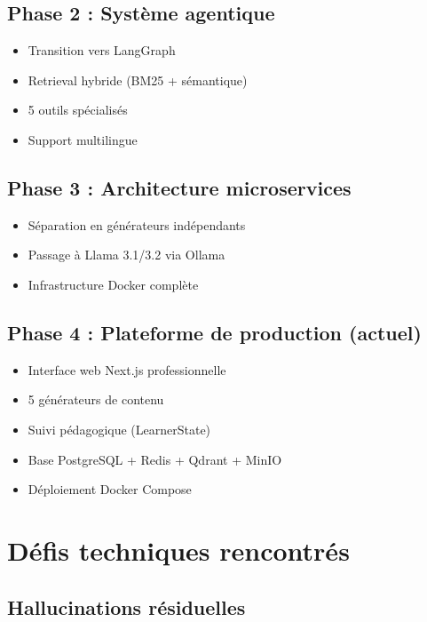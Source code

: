 \documentclass[12pt,a4paper]{article}
\begin{document}
\subsection{Phase 2 : Système agentique}

\begin{itemize}
    \item Transition vers LangGraph
    \item Retrieval hybride (BM25 + sémantique)
    \item 5 outils spécialisés
    \item Support multilingue
\end{itemize}

\subsection{Phase 3 : Architecture microservices}

\begin{itemize}
    \item Séparation en générateurs indépendants
    \item Passage à Llama 3.1/3.2 via Ollama
    \item Infrastructure Docker complète
\end{itemize}

\subsection{Phase 4 : Plateforme de production (actuel)}

\begin{itemize}
    \item Interface web Next.js professionnelle
    \item 5 générateurs de contenu
    \item Suivi pédagogique (LearnerState)
    \item Base PostgreSQL + Redis + Qdrant + MinIO
    \item Déploiement Docker Compose
\end{itemize}

\section{Défis techniques rencontrés}

\subsection{Hallucinations résiduelles}
\end{document}
